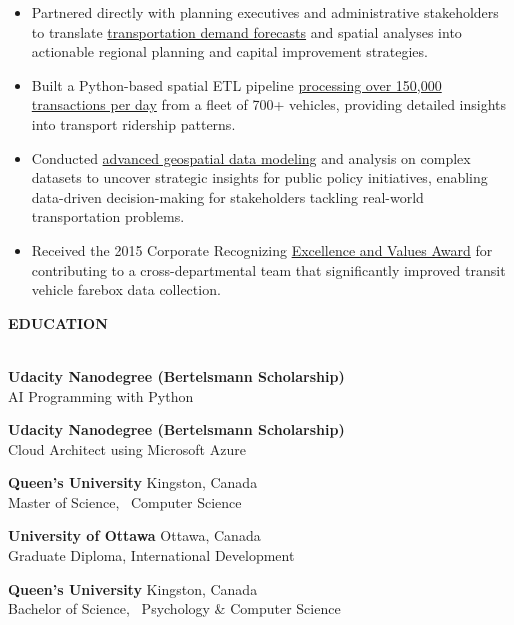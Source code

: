 \documentclass[letterpaper]{article}
\newcommand{\lineunder} {
        \vspace*{-8pt} \\
        \hspace*{-18pt} \hrulefill \\
    }
\newcommand{\header} [1] {
        \vspace{9pt}
        {\hspace*{-18pt}\vspace*{6pt} \large \textbf {#1}}
        \vspace*{-6pt} \lineunder
        \vspace{2pt}
    }
\newenvironment{jobtasklist}
        {
            \vspace{-12pt}
            \begin{itemize} \itemsep 0pt
        }{
            \end{itemize}
            \vspace{-3pt}
        }
\newcommand{\university}[3]{
        \textbf{#1}  %
        \hfill #2\\  %
        #3\\         %
        \vspace{2mm}
    }
\newcommand{\impt}[1]{\uline{#1}}
\begin{document}
\begin{jobtasklist}
    \item Partnered directly with planning executives and administrative stakeholders to translate
            \impt{transportation demand forecasts} and spatial analyses into actionable regional planning
            and capital improvement strategies.
    \item Built a Python-based spatial ETL pipeline
            \impt{processing over 150,000 transactions per day}
            from a fleet of 700+ vehicles, providing detailed insights into transport ridership patterns.
    \item Conducted \impt{advanced geospatial data modeling} and analysis on complex datasets
            to uncover strategic insights for public policy initiatives,
            enabling data-driven decision-making for stakeholders tackling real-world transportation problems.
    \item Received the 2015 Corporate Recognizing \impt{Excellence and Values Award}
            for contributing to a cross-departmental team that significantly
            improved transit vehicle farebox data collection.
\end{jobtasklist}


\vspace{25pt}

\header{EDUCATION}
    \university
        {Udacity Nanodegree (Bertelsmann Scholarship)}
        {}
        {AI Programming with Python}
    \university
        {Udacity Nanodegree (Bertelsmann Scholarship)}
        {}
        {Cloud Architect using Microsoft Azure}
    \university
        {Queen's University}
        {Kingston, Canada}
        {Master of Science, ~Computer Science}

    \university
        {University of Ottawa}
        {Ottawa, Canada}
        {Graduate Diploma, International Development}

    \university
        {Queen's University}
        {Kingston, Canada}
        {Bachelor of Science, ~Psychology \& Computer Science}
\end{document}
